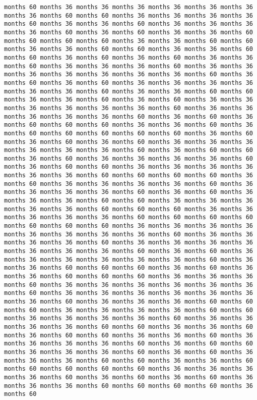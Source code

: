 \documentclass[11pt]{article}
\begin{document}
\begin{Verbatim}[commandchars=\\\{\}, frame=single, framerule=2mm, rulecolor=\color{outerrorbackground}]
months 60 months 36 months 36 months 36 months 36 months 36 months 36 months 36 months 60 months 60 months 36 months 36 months 36 months 36 months 60 months 36 months 36 months 60 months 36 months 36 months 36 months 36 months 60 months 36 months 60 months 36 months 36 months 60 months 60 months 60 months 60 months 36 months 36 months 60 months 60 months 36 months 36 months 60 months 60 months 36 months 36 months 60 months 60 months 36 months 60 months 36 months 60 months 36 months 36 months 60 months 36 months 36 months 36 months 60 months 36 months 36 months 36 months 36 months 36 months 36 months 36 months 60 months 36 months 60 months 36 months 60 months 36 months 36 months 36 months 36 months 36 months 36 months 60 months 36 months 36 months 60 months 60 months 36 months 36 months 60 months 36 months 60 months 36 months 36 months 36 months 36 months 36 months 36 months 60 months 36 months 36 months 36 months 36 months 36 months 60 months 36 months 60 months 36 months 60 months 60 months 60 months 36 months 36 months 60 months 36 months 60 months 60 months 60 months 60 months 60 months 36 months 60 months 36 months 60 months 36 months 60 months 36 months 36 months 36 months 36 months 36 months 36 months 60 months 36 months 60 months 60 months 36 months 60 months 36 months 36 months 36 months 36 months 60 months 36 months 60 months 60 months 36 months 36 months 36 months 36 months 36 months 36 months 60 months 60 months 60 months 60 months 36 months 60 months 36 months 36 months 36 months 36 months 60 months 36 months 36 months 36 months 36 months 60 months 36 months 60 months 36 months 36 months 36 months 60 months 60 months 36 months 36 months 36 months 36 months 36 months 60 months 60 months 60 months 36 months 36 months 36 months 36 months 36 months 60 months 60 months 60 months 60 months 60 months 60 months 60 months 36 months 36 months 36 months 36 months 36 months 36 months 36 months 36 months 60 months 36 months 36 months 36 months 36 months 60 months 36 months 36 months 36 months 36 months 36 months 36 months 36 months 60 months 36 months 60 months 36 months 36 months 36 months 36 months 36 months 36 months 60 months 36 months 36 months 60 months 60 months 60 months 36 months 60 months 36 months 36 months 60 months 60 months 60 months 36 months 36 months 36 months 60 months 36 months 36 months 36 months 36 months 36 months 36 months 60 months 36 months 36 months 36 months 36 months 36 months 36 months 36 months 60 months 36 months 36 months 36 months 60 months 60 months 60 months 36 months 36 months 36 months 36 months 60 months 60 months 36 months 36 months 36 months 36 months 60 months 36 months 36 months 36 months 36 months 60 months 60 months 36 months 36 months 60 months 36 months 60 months 60 months 36 months 36 months 60 months 36 months 36 months 36 months 36 months 60 months 36 months 60 months 60 months 36 months 36 months 36 months 60 months 36 months 60 months 36 months 36 months 36 months 60 months 60 months 36 months 36 months 60 months 60 months 60 months 60 months 60 months 36 months 36 months 36 months 36 months 60 months 36 months 60 months 36 months 60 months 36 months 36 months 36 months 60 months 60 months 60 months 60 months 36 months 60 
\end{Verbatim}
\end{document}
